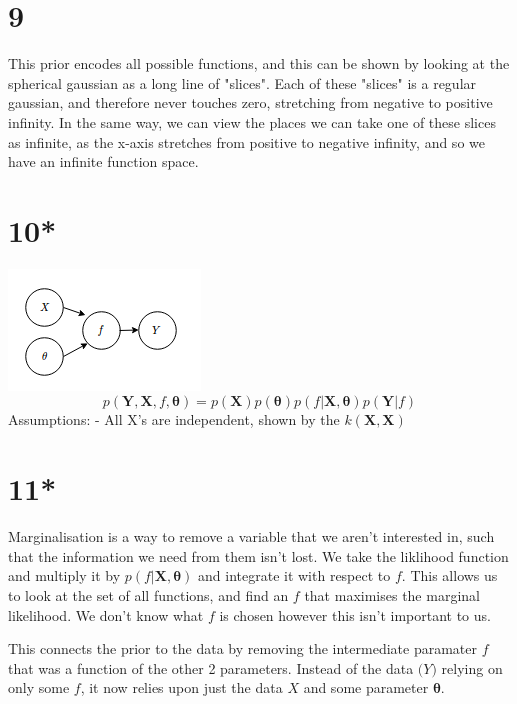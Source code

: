 \documentclass[11pt]{article}
\makeatletter
\def\maxwidth{\ifdim\Gin@nat@width>\linewidth\linewidth
    \else\Gin@nat@width\fi}
\let\Oldincludegraphics\includegraphics
\renewcommand{\includegraphics}[1]{\Oldincludegraphics[width=.8\maxwidth]{#1}}
\makeatother
\begin{document}
    \section*{9}\label{section}

This prior encodes all possible functions, and this can be shown by
looking at the spherical gaussian as a long line of "slices". Each of
these "slices" is a regular gaussian, and therefore never touches zero,
stretching from negative to positive infinity. In the same way, we can
view the places we can take one of these slices as infinite, as the
x-axis stretches from positive to negative infinity, and so we have an
infinite function space.

    \section*{10*}\label{section}

\includegraphics{q10.png}
\[p(\boldsymbol{Y}, \boldsymbol{X}, f, \boldsymbol{\theta}) = p(\boldsymbol{X}) p(\boldsymbol{\theta}) p(f|\boldsymbol{X},\boldsymbol{\theta})p(\boldsymbol{Y}|f)\]
Assumptions: - All X's are independent, shown by the
\(k(\pmb X, \pmb X)\)

    \section*{11*}\label{section}

Marginalisation is a way to remove a variable that we aren't interested
in, such that the information we need from them isn't lost. We take the
liklihood function and multiply it by
\(p(f|\boldsymbol{X},\boldsymbol{\theta})\) and integrate it with
respect to \(f\). This allows us to look at the set of all functions,
and find an \(f\) that maximises the marginal likelihood. We don't know
what \(f\) is chosen however this isn't important to us.

This connects the prior to the data by removing the intermediate
paramater \(f\) that was a function of the other 2 parameters. Instead
of the data \(\boldsymbol(Y)\) relying on only some \(f\), it now relies
upon just the data \(X\) and some parameter \(\boldsymbol{\theta}\).
\end{document}
